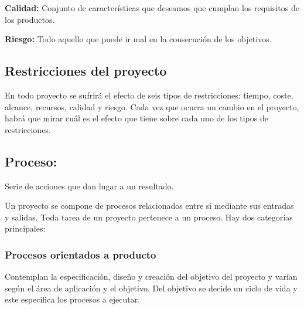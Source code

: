 \documentclass{article}
\begin{document}
\begin{theorem}
\textbf{Calidad: }Conjunto de características que deseamos que cumplan los requisitos de los productos.
\end{theorem}

\begin{theorem}
\textbf{Riesgo: }Todo aquello que puede ir mal en la consecución de los objetivos.
\end{theorem}

\subsection{Restricciones del proyecto}
En todo proyecto se sufrirá el efecto de seis tipos de restricciones: tiempo, coste, alcance, recursos, calidad y riesgo. Cada vez que ocurra un cambio en el proyecto, habrá que mirar cuál es el efecto que tiene sobre cada uno de los tipos de restricciones.

\subsection{Proceso:}
\begin{theorem}
Serie de acciones que dan lugar a un resultado.
\end{theorem}
Un proyecto se compone de procesos relacionados entre sí mediante sus entradas y salidas. Toda tarea de un proyecto pertenece a un proceso.
Hay dos categorías principales:
\subsubsection{Procesos orientados a producto}
Contemplan la especificación, diseño y creación del objetivo del proyecto y varían según el área de aplicación y el objetivo. Del objetivo se decide un ciclo de vida y este especifica los procesos a ejecutar.
\end{document}
